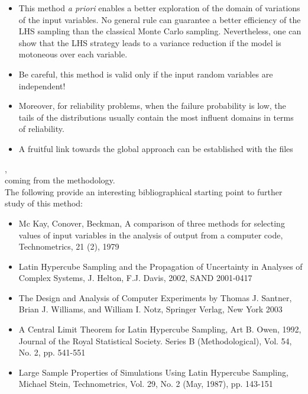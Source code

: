             {

              \begin{itemize}
              \item This method \textit{a priori} enables a better exploration of the domain of variations of the input variables. No general rule can guarantee a better efficiency of the LHS sampling than the classical Monte Carlo sampling. Nevertheless, one can show that the LHS strategy leads to a variance reduction if the model is motoneous over each variable.
              \item Be careful, this method is valid only if the input random variables are independent!
              \item Moreover, for reliability problems, when the failure probability is low, the tails of the distributions usually contain the most influent domains in terms of reliability.
              \item A fruitful link towards the global approach can be established with the files
              \end{itemize}


              , \\
               coming from the methodology.\\

              The following provide an interesting bibliographical starting point to further study of this method:
              \begin{itemize}
              \item Mc Kay, Conover, Beckman, A comparison of three methods for selecting values of input variables in the analysis of output from a computer code, Technometrics, 21 (2), 1979
              \item Latin Hypercube Sampling and the Propagation of Uncertainty in Analyses of Complex Systems, J. Helton, F.J. Davis, 2002, SAND 2001-0417
              \item The Design and Analysis of Computer Experiments by Thomas J. Santner, Brian J. Williams, and William I. Notz, Springer Verlag, New York 2003
              \item A Central Limit Theorem for Latin Hypercube Sampling, Art B. Owen, 1992, Journal of the Royal Statistical Society. Series B (Methodological), Vol. 54, No. 2, pp. 541-551
              \item Large Sample Properties of Simulations Using Latin Hypercube Sampling, Michael Stein, Technometrics, Vol. 29, No. 2 (May, 1987), pp. 143-151
              \end{itemize}

            }


